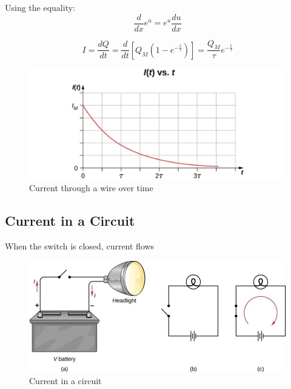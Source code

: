 \documentclass[14pt]{memoir}
\begin{document}
Using the equality:
\begin{equation}
\frac{d}{dx} e^u = e^u \frac{du}{dx}
\end{equation}

\begin{equation}
I = \frac{dQ}{dt} = \frac{d}{dt}[Q_M (1 - e^{-\frac{t}{\tau}})] = \frac{Q_M}{\tau} e^{-\frac{t}{\tau}}
\end{equation}

\begin{figure}[H]
\begin{center}
\includegraphics[scale=0.50]{fig/fig_09_04.jpg}
\caption{Current through a wire over time}
\label{fig:09_04}
\end{center}
\end{figure}

\subsection{Current in a Circuit}

When the switch is closed, current flows

\begin{figure}[H]
\begin{center}
\includegraphics[scale=0.50]{fig/fig_09_05.jpg}
\caption{Current in a circuit}
\label{fig:09_05}
\end{center}
\end{figure}
\end{document}
